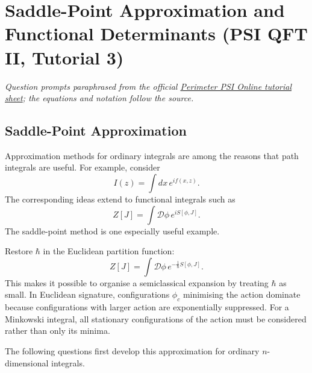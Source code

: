 \section{Saddle-Point Approximation and Functional Determinants (PSI QFT II, Tutorial 3)}

\noindent\textit{Question prompts paraphrased from the official
\href{https://psi-online.perimeterinstitute.ca/courses/take/quantum-field-theory-ii-student/pdfs/20776373-module-3-tutorial-2}{Perimeter PSI Online tutorial sheet};
the equations and notation follow the source.}

\subsection{Saddle-Point Approximation}

Approximation methods for ordinary integrals are among the reasons that path
integrals are useful. For example, consider
\begin{equation}
    I(z)=\int dx\,e^{if(x,z)}.
\end{equation}
The corresponding ideas extend to functional integrals such as
\begin{equation}
    Z[J]=\int\mathcal D\phi\,e^{iS[\phi,J]}.
\end{equation}
The saddle-point method is one especially useful example.

Restore $\hbar$ in the Euclidean partition function:
\begin{equation}
    Z[J]
    =\int\mathcal D\phi\,
    e^{-\frac{1}{\hbar}S[\phi,J]}.
\end{equation}
This makes it possible to organise a semiclassical expansion by treating $\hbar$
as small. In Euclidean signature, configurations $\phi_c$ minimising the action
dominate because configurations with larger action are exponentially suppressed.
For a Minkowski integral, all stationary configurations of the action must be
considered rather than only its minima.

The following questions first develop this approximation for ordinary
$n$-dimensional integrals.

